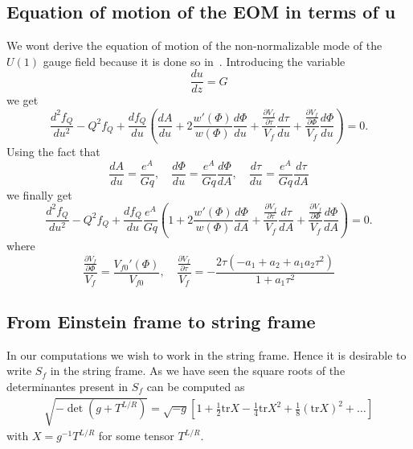 \documentclass[a4paper,12pt]{article}
\begin{document}
\subsection{Equation of motion of the EOM in terms of u}
We wont derive the equation of motion of the non-normalizable mode of the $U\left(1\right)$ gauge field because it is done so in~\cite{Arean:2013tja}. Introducing the variable
\begin{equation}
\frac{du}{dz} = G
\end{equation}
we get
\begin{equation}
\frac{d^2 f_Q}{d u^2} - Q^2 f_Q + \frac{d f_Q}{du} \left( \frac{dA}{du} + 2 \frac{w'\left(\Phi\right)}{w\left(\Phi\right)} \frac{d\Phi}{du} + \frac{\frac{\partial V_f}{\partial \tau}}{V_f} \frac{d\tau}{du} +  \frac{\frac{\partial V_f}{\partial \Phi}}{V_f} \frac{d\Phi}{du} \right) = 0.
\end{equation}
Using the fact that
\begin{equation}
\frac{dA}{du} = \frac{e^A}{G q} , \quad  \frac{d\Phi}{du} = \frac{e^A}{G q} \frac{d\Phi}{dA} , \quad \frac{d\tau}{du} = \frac{e^A}{G q} \frac{d\tau}{dA}
\end{equation}
we finally get
\begin{equation}
\frac{d^2 f_Q}{d u^2} - Q^2 f_Q + \frac{d f_Q}{du} \frac{e^A}{G q} \left(1 + 2 \frac{w'\left(\Phi\right)}{w\left(\Phi\right)} \frac{d\Phi}{dA} + \frac{\frac{\partial V_f}{\partial \tau}}{V_f} \frac{d\tau}{dA} +  \frac{\frac{\partial V_f}{\partial \Phi}}{V_f} \frac{d\Phi}{dA} \right) = 0.
\end{equation}
where
\begin{equation}
 \frac{\frac{\partial V_f}{\partial \Phi}}{V_f} = \frac{V_{f0}'\left(\Phi\right)}{V_{f0}}, \quad   \frac{\frac{\partial V_f}{\partial \tau}}{V_f} = - \frac{2\tau\left( -a_1 + a_2 + a_1 a_2 \tau^2\right)}{1 +a_1 \tau^2}
\end{equation}

\subsection{From Einstein frame to string frame}

In our computations we wish to work in the string frame. Hence it is desirable to write $S_f$ in the string frame. As we have seen the square roots of the determinantes present in $S_f$ can be computed as
\begin{align}
\sqrt{-\det \left( g + T^{L/R} \right)} = \sqrt{-g} \left[ 1 + \frac{1}{2} \text{tr} X - \frac{1}{4} \text{tr} X^2 + \frac{1}{8} {\left( \text{tr} X \right)}^2 + \dots \right]
\end{align}
with $X = g^{-1} T^{L/R}$ for some tensor $T^{L/R}$.
\end{document}
